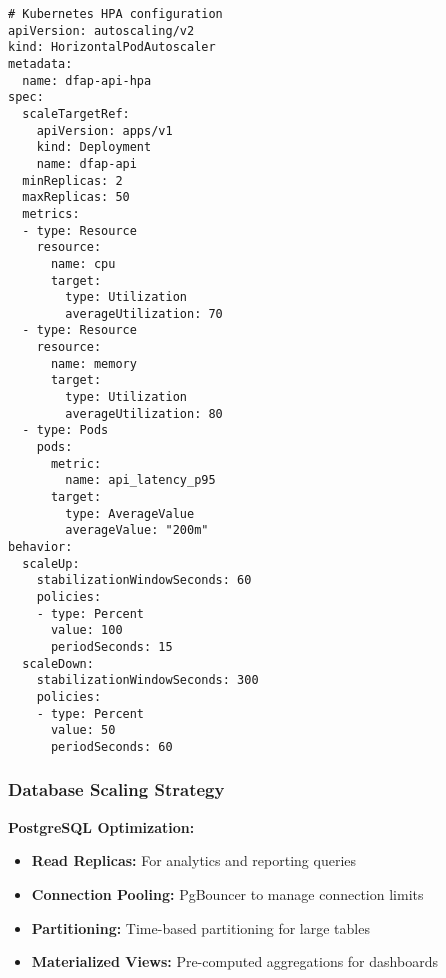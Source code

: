 \begin{verbatim}
# Kubernetes HPA configuration
apiVersion: autoscaling/v2
kind: HorizontalPodAutoscaler
metadata:
  name: dfap-api-hpa
spec:
  scaleTargetRef:
    apiVersion: apps/v1
    kind: Deployment
    name: dfap-api
  minReplicas: 2
  maxReplicas: 50
  metrics:
  - type: Resource
    resource:
      name: cpu
      target:
        type: Utilization
        averageUtilization: 70
  - type: Resource
    resource:
      name: memory
      target:
        type: Utilization
        averageUtilization: 80
  - type: Pods
    pods:
      metric:
        name: api_latency_p95
      target:
        type: AverageValue
        averageValue: "200m"
behavior:
  scaleUp:
    stabilizationWindowSeconds: 60
    policies:
    - type: Percent
      value: 100
      periodSeconds: 15
  scaleDown:
    stabilizationWindowSeconds: 300
    policies:
    - type: Percent
      value: 50
      periodSeconds: 60
\end{verbatim}

\subsubsection{Database Scaling Strategy}

\textbf{PostgreSQL Optimization:}
\begin{itemize}
  \item \textbf{Read Replicas:} For analytics and reporting queries
  \item \textbf{Connection Pooling:} PgBouncer to manage connection limits
  \item \textbf{Partitioning:} Time-based partitioning for large tables
  \item \textbf{Materialized Views:} Pre-computed aggregations for dashboards
\end{itemize}

